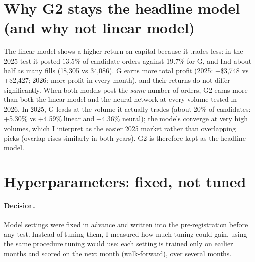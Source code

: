 \documentclass[11pt,a4paper]{article}
\begin{document}
\section{Why G2 stays the headline model (and why not linear model)}\label{sec:linear}
The linear model shows a higher return on capital because it trades less: in the 2025 test it posted 13.5\% of
candidate orders against 19.7\% for G, and had about half as many fills (18,305 vs 34,086). G earns more total profit (2025: +\$3,748 vs +\$2,427; 2026: more profit
in every month), and their returns do not differ significantly. When both models post the \emph{same} number of
orders, G2 earns more than both the linear model and the neural network at every volume tested in 2026. In 2025, G
leads at the volume it actually trades (about 20\% of candidates: +5.30\% vs +4.59\% linear and +4.36\% neural);
the models converge at very high volumes, which I interpret as the easier 2025 market rather than overlapping
picks (overlap rises similarly in both years). G2 is therefore kept as the headline model.

\section{Hyperparameters: fixed, not tuned}\label{sec:tuning}
\paragraph{Decision.} Model settings were fixed in advance and written into the pre-registration before any test.
Instead of tuning them, I measured how much tuning could gain, using the same procedure tuning would use: each
setting is trained only on earlier months and scored on the next month (walk-forward), over several months.
\end{document}
